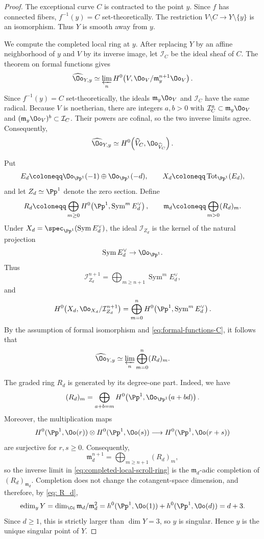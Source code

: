 \documentclass[12pt]{amsart}
\newcommand{\edim}{\operatorname{edim}}
\newcommand{\Sym}{\operatorname{Sym}}
\newcommand{\Tot}{\operatorname{Tot}}
\begin{document}
\begin{proof}
The exceptional curve $C$ is contracted to the point $y$. Since $f$ has connected fibers, $f^{-1}(y)=C$ set-theoretically. The restriction $V\setminus C\to Y\setminus\{y\}$ is an isomorphism. Thus $Y$ is smooth away from $y$.

We compute the completed local ring at $y$. After replacing $Y$ by an affine neighborhood of $y$ and $V$ by its inverse image, let $\mathcal I_C$ be the ideal sheaf of $C$. The theorem on formal functions \cite[III, Theorem~11.1]{Har77} gives
\[
 \widehat{\Oo}_{Y,y}
 \simeq
 \varprojlim_n
 H^0\!\left(V,\Oo_V/\mathfrak m_y^{n+1}\Oo_V\right).
\]
Since $f^{-1}(y)=C$ set-theoretically, the ideals $\mathfrak m_y\Oo_V$ and $\mathcal I_C$ have the same radical. Because $V$ is noetherian, there are integers $a,b>0$ with $\mathcal I_C^a\subset\mathfrak m_y\Oo_V$ and $(\mathfrak m_y\Oo_V)^b\subset\mathcal I_C$. Their powers are cofinal, so the two inverse limits agree. Consequently,
\begin{equation}\label{eq:formal-functions-C}
 \widehat{\Oo}_{Y,y}
 \simeq
 H^0\!\left(\widehat V_C,\Oo_{\widehat V_C}\right).
\end{equation}

Put
\[
 E_d\coloneqq\Oo_{\Pp^1}(-1)\oplus\Oo_{\Pp^1}(-d),
 \qquad
 X_d\coloneqq\Tot_{\Pp^1}(E_d),
\]
and let $Z_d\simeq\Pp^1$ denote the zero section. Define
\[
 R_d\coloneqq\bigoplus_{m\geq0}
 H^0\!\left(\Pp^1,\Sym^mE_d^\vee\right),
 \qquad
 \mathfrak m_d\coloneqq\bigoplus_{m>0}(R_d)_m.
\]
Under $X_d=\spec_{\Pp^1}(\Sym E_d^\vee)$, the ideal $\mathcal I_{Z_d}$ is the kernel of the natural projection \[\Sym E_d^\vee\to\Oo_{\Pp^1}.\] Thus
\[
 \mathcal I_{Z_d}^{n+1}=\bigoplus_{m\geq n+1}\Sym^mE_d^\vee,
\]
and
\[
 H^0\!\left(X_d,\Oo_{X_d}/\mathcal I_{Z_d}^{n+1}\right)
 =
 \bigoplus_{m=0}^n
 H^0\!\left(\Pp^1,\Sym^mE_d^\vee\right).
\]
By the assumption of formal isomorphism and \eqref{eq:formal-functions-C}, it follows that
\begin{equation}\label{eq:completed-local-scroll-ring}
 \widehat{\Oo}_{Y,y}
 \simeq
 \varprojlim_n\bigoplus_{m=0}^n(R_d)_m.
\end{equation}

The graded ring $R_d$ is generated by its degree-one part. Indeed, we have
\begin{equation}\label{eq: R_d}
   (R_d)_m
 =
 \bigoplus_{a+b=m}
 H^0\!\left(\Pp^1,\Oo_{\Pp^1}(a+bd)\right).
\end{equation}
Moreover, the multiplication maps
\[
 H^0(\Pp^1,\Oo(r))\otimes H^0(\Pp^1,\Oo(s))
 \longrightarrow H^0(\Pp^1,\Oo(r+s))
\]
are surjective for $r,s\geq0$. Consequently,
\[
 \mathfrak m_d^{n+1}
 =
 \bigoplus_{m\geq n+1}(R_d)_m,
\]
so the inverse limit in \eqref{eq:completed-local-scroll-ring} is the $\mathfrak m_d$-adic completion of $(R_d)_{\mathfrak m_d}$. Completion does not change the cotangent-space dimension, and therefore, by \eqref{eq: R_d},
\[
 \edim_yY=\dim_{\Cc}\mathfrak m_d/\mathfrak m_d^2
 =h^0(\Pp^1,\Oo(1))+h^0(\Pp^1,\Oo(d))=d+3.
\]
Since $d\geq1$, this is strictly larger than $\dim Y=3$, so $y$ is singular. Hence $y$ is the unique singular point of $Y$.
\end{proof}
\end{document}
